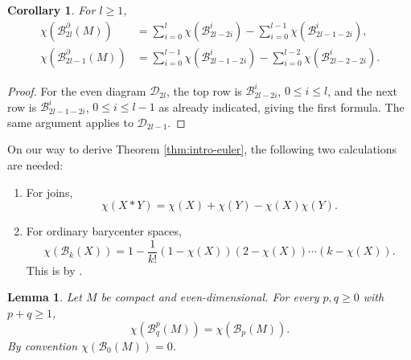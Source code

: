 \documentclass[11pt,a4paper]{article}
\numberwithin{equation}{section}
\newtheorem{lem}[thm]{Lemma}
\newtheorem{cor}[thm]{Corollary}
\theoremstyle{definition}
\theoremstyle{remark}
\newcommand{\pa}{\partial}
\newcommand{\ch}{\chi}
\newcommand{\BB}{\mathcal B}
\begin{document}
\begin{cor}\label{lem:euler-sum}
For \(l\ge1\),
\begin{align*}
\ch(\BB_{2l}^{\pa}(M))
&=
\sum_{i=0}^{l}\ch(\BB_{2l-2i}^{i})-
\sum_{i=0}^{l-1}\ch(\BB_{2l-1-2i}^{i}),\\
\ch(\BB_{2l-1}^{\pa}(M))
&=
\sum_{i=0}^{l-1}\ch(\BB_{2l-1-2i}^{i})-
\sum_{i=0}^{l-2}\ch(\BB_{2l-2-2i}^{i}).
\end{align*}
\end{cor}

\begin{proof}
For the even diagram $\mathcal D_{2l}$, the top row is \(\BB_{2l-2i}^{i}\), \(0\le i\le l\), and the next row is \(\BB_{2l-1-2i}^{i}\), \(0\le i\le l-1\) as already indicated, giving the first formula. The same argument applies to $\mathcal D_{2l-1}$.
\end{proof}

On our way to derive Theorem \ref{thm:intro-euler}, the  following two calculations are needed:
\begin{enumerate}
\item For joins,
\begin{equation}\label{eq:euler-join}
\ch(X*Y)=\ch(X)+\ch(Y)-\ch(X)\ch(Y).
\end{equation}
\item For ordinary barycenter spaces,
\begin{equation}\label{eq:ordinary-euler}
\ch(\BB_k(X))=
1-\frac1{k!}(1-\ch(X))(2-\ch(X))\cdots(k-\ch(X)).
\end{equation}
This is by \cite[Corollary 1.4(a)]{KallelKaroui2011}.
\end{enumerate}

\begin{lem}\label{lem:Bpq-euler}
Let \(M\) be compact and even-dimensional.  For every \(p,q\ge0\) with \(p+q\ge1\),
\begin{equation*}
\ch(\BB_q^p(M))=\ch(\BB_p(M)).
\end{equation*}
By convention $\chi (\BB_0(M))=0$.
\end{lem}
\end{document}
